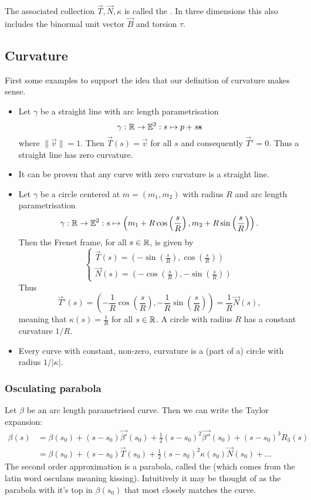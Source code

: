 The associated collection $\vec{T}, \vec{N}, \kappa$ is called the . In three dimensions this also includes the binormal unit vector $\vec{B}$ and torsion $\tau$.

\subsection{Curvature}
First some examples to support the idea that our definition of curvature makes sense.
\begin{example}
\begin{itemize}
\item Let $\gamma$ be a straight line with arc length parametrisation
\[ \gamma: \mathbb{R} \to \mathbb{E}^2: s\mapsto p + s \boldsymbol{\mathrm{s}} \]
where $\lVert \vec{v}\lVert = 1$. Then $\vec{T}(s) = \vec{v}$ for all $s$ and consequently $\vec{T}' = 0$. Thus a straight line has zero curvature.
\item It can be proven that any curve with zero curvature is a straight line.
\item Let $\gamma$ be a circle centered at $m= (m_1,m_2)$ with radius $R$ and arc length parametrisation
\[ \gamma: \mathbb{R} \to \mathbb{E}^2: s\mapsto \left(m_1 + R\cos \left(\frac{s}{R}\right), m_2 + R\sin \left(\frac{s}{R}\right)\right). \]
Then the Frenet frame, for all $s\in\mathbb{R}$, is given by
\[ \begin{cases}
\vec{T}(s) = \left(-\sin \left(\frac{s}{R}\right), \cos \left(\frac{s}{R}\right)\right) \\
\vec{N}(s) = \left(-\cos \left(\frac{s}{R}\right), -\sin \left(\frac{s}{R}\right)\right)
\end{cases} \]
Thus
\[ \vec{T}'(s) = \left(- \frac{1}{R}\cos \left(\frac{s}{R}\right), - \frac{1}{R}\sin \left(\frac{s}{R}\right)\right) = \frac{1}{R} \vec{N}(s), \]
meaning that $\kappa(s) = \frac{1}{R}$ for all $s\in \mathbb{R}$. A circle with radius $R$ has a constant curvature $1/R$.
\item Every curve with constant, non-zero, curvature is a (part of a) circle with radius $1/|\kappa|$.
\end{itemize}
\end{example}
\subsubsection{Osculating parabola}
Let $\beta$ be an arc length parametrised curve. Then we can write the Taylor expansion:
\begin{align*}
\beta(s) &= \beta(s_0) + (s-s_0)\vec{\beta'}(s_0) + \frac{1}{2}(s-s_0)^2\vec{\beta''}(s_0) + (s-s_0)^3R_3(s) \\
&= \beta(s_0) + (s-s_0)\vec{T}(s_0) + \frac{1}{2}(s-s_0)^2\kappa(s_0)\vec{N}(s_0) + \ldots
\end{align*}
The second order approximation is a parabola, called the  (which comes from the latin word osculans meaning kissing). Intuitively it may be thought of as the parabola with it's top in $\beta(s_0)$ that most closely matches the curve.

